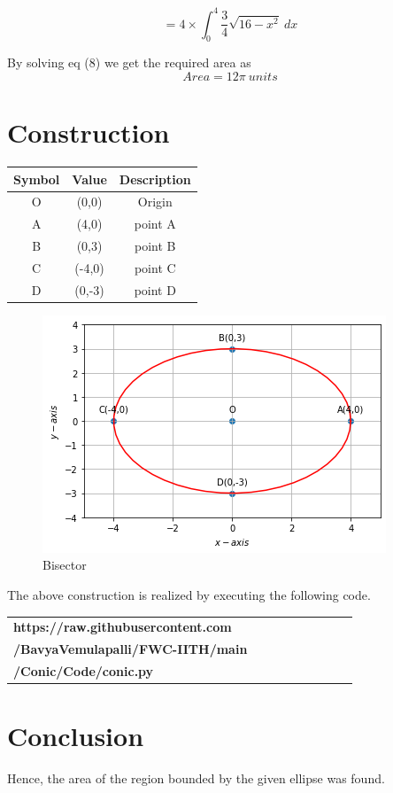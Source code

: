\documentclass[journal,10pt,twocolumn]{article}
\begin{document}
    \begin{equation}
        = 4 \times \int_{0}^{4} \frac{3}{4} \sqrt{16 - x^2} \ dx 
    \end{equation}
    
    By solving eq (8) we get the required area as
    \begin{equation}
        \boxed{Area = 12\pi \ units}
    \end{equation}
    
\section{Construction}

\begin{table}[h]
	\centering
\setlength\extrarowheight{2pt}
	\begin{tabular}{|c|c|c|}
		\hline
		\textbf{Symbol} & \textbf{Value} & \textbf{Description} \\
		\hline
		O & (0,0) & Origin\\
		\hline
		A & (4,0) & point A\\
		\hline
		B & (0,3) & point B\\
		\hline
		C & (-4,0) & point C\\
		\hline
		D & (0,-3) & point D\\
		\hline
	\end{tabular}
\end{table}

\begin{figure}[H]
    \centering
    \includegraphics[scale=0.5]{conic.jpg}
    \caption{Bisector}
    \label{fig:Bisector}
\end{figure}

    The above construction is realized by executing the following code.
    
\begin{table}[H]
\begin{tabular}{|l|c|c|c|c|c|c|c|c}\hline\textbf{https://raw.githubusercontent.com}\\
    \textbf{/BavyaVemulapalli/FWC-IITH/main} \\
    \textbf{/Conic/Code/conic.py} \\ \hline
\end{tabular}
\end{table}

\section{Conclusion}

    Hence, the area of the region bounded by the given ellipse was found.
\end{document}
